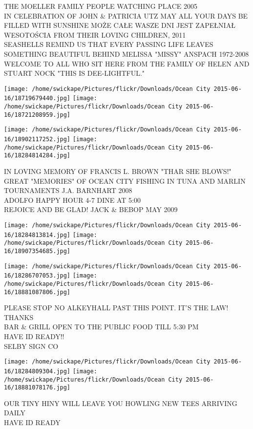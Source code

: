 \documentclass[10pt,letterpaper]{article}
\begin{document}
THE MOELLER FAMILY PEOPLE WATCHING PLACE 2005\\
IN CELEBRATION OF JOHN \& PATRICIA UTZ MAY ALL YOUR DAYS BE FILLED WITH SUNSHINE MOŻE CAŁE WASZE DNI JEST ZAPEŁNIAŁ WESOTOŚCIA FROM THEIR LOVING CHILDREN, 2011\\
SEASHELLS REMIND US THAT EVERY PASSING LIFE LEAVES SOMETHING BEAUTIFUL BEHIND MELISSA "MISSY" ANSPACH 1972{-}2008\\
WELCOME TO ALL WHO SIT HERE FROM THE FAMILY OF HELEN AND STUART NOCK "THIS IS DEE{-}LIGHTFUL."
\pagebreak

\texttt{[image: /home/swickape/Pictures/flickr/Downloads/Ocean City 2015-06-16/18719679440.jpg]}
\texttt{[image: /home/swickape/Pictures/flickr/Downloads/Ocean City 2015-06-16/18721208959.jpg]}

\texttt{[image: /home/swickape/Pictures/flickr/Downloads/Ocean City 2015-06-16/18902117252.jpg]}
\texttt{[image: /home/swickape/Pictures/flickr/Downloads/Ocean City 2015-06-16/18284814284.jpg]}

IN LOVING MEMORY OF FRANCIS L. BROWN "THAR SHE BLOWS!"\\
GREAT "MEMORIES" OF OCEAN CITY FISHING IN TUNA AND MARLIN TOURNAMENTS J.A. BARNHART 2008\\
ADOLFO HAPPY HOUR 4{-}7 DINE AT 5:00\\
REJOICE AND BE GLAD!  JACK \& BEBOP MAY 2009
\pagebreak

\texttt{[image: /home/swickape/Pictures/flickr/Downloads/Ocean City 2015-06-16/18284813814.jpg]}
\texttt{[image: /home/swickape/Pictures/flickr/Downloads/Ocean City 2015-06-16/18907354685.jpg]}

\texttt{[image: /home/swickape/Pictures/flickr/Downloads/Ocean City 2015-06-16/18286707053.jpg]}
\texttt{[image: /home/swickape/Pictures/flickr/Downloads/Ocean City 2015-06-16/18881087806.jpg]}

PLEASE STOP NO ALKEYHALL PAST THIS POINT.  IT'S THE LAW!  THANKS\\
BAR \& GRILL OPEN TO THE PUBLIC FOOD TILL 5:30 PM\\
HAVE ID READY!!\\
SELBY SIGN CO
\pagebreak

\texttt{[image: /home/swickape/Pictures/flickr/Downloads/Ocean City 2015-06-16/18284809304.jpg]}
\texttt{[image: /home/swickape/Pictures/flickr/Downloads/Ocean City 2015-06-16/18881078176.jpg]}

OUR TINY HINY WILL LEAVE YOU HOWLING NEW TEES ARRIVING DAILY\\
HAVE ID READY
\pagebreak
\end{document}
